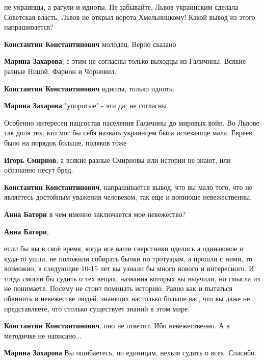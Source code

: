 \begin{itemize}
\begin{itemize}
не украинцы, а рагули и идиоты. Не забывайте, Львов украинским сделала
Советская власть, Львов не открыл ворота Хмельницкому! Какой вывод из этого
напрашивается?

\textbf{Константин Константинович} молодец. Верно сказано

\textbf{Марина Захарова}, с этим не согласны только выходцы из Галичины. Всякие разные Ницой, Фарион и Чорновил.

\textbf{Константин Константинович} идиоты, только идиоты

\textbf{Марина Захарова} "упоротые" - эти да, не согласны.


Особенно интересен нацсостав населения Галичины до мировых войн. Во Львове так
доля тех, кто мог бы себя назвать украинцем была исчезающе мала. Евреев было на
порядок больше, поляков тоже


\textbf{Игорь Смирнов}, а всякие разные Смирновы или истории не знают, или осознанно несут бред.

\textbf{Константин Константинович}, напрашивается вывод, что вы мало того, что не являетесь достойным уважения человеком, так еще и вопиюще невежественны.

\textbf{Анна Батори} в чем именно заключается мое невежество?

\textbf{Анна Батори}, 

если бы вы в своё время, когда все ваши сверстники оделись а одинаковое и
куда-то ушли, не положили собирать бычки по тротуарам, а прошли с ними, то
возможно, в следующие 10-15 лет вы узнали бы много нового и интересного. И
тогда смогли бы судить о тех вещах, названия которых вы выучили, но смысла из
не понимаете. Посему не стоит поминать историю. Равно как и пытаться обвинить в
невежестве людей, знающих настолько больше вас, что вы даже не представляете,
что столько существует знаний в этом мире.


\textbf{Константин Константинович}, оно не ответит. Ибо невежественно. А в методичке не написано...

\textbf{Марина Захарова} Вы ошибаетесь, по единицам, нельзя судить о всех. Спасибо.

\end{itemize} %



\end{itemize}
